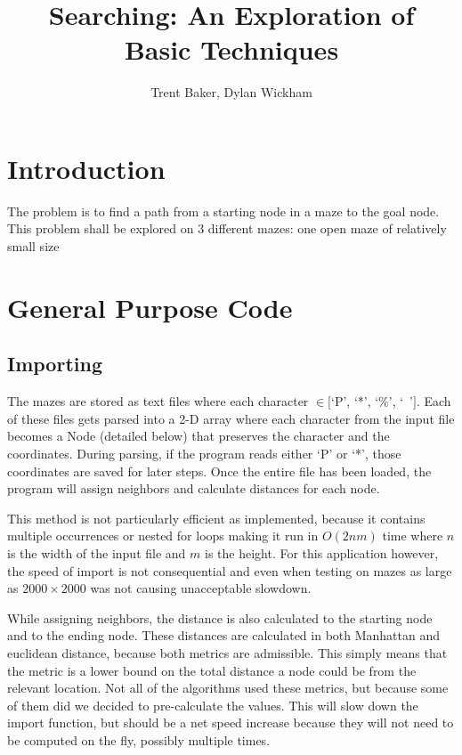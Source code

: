 \documentclass{article}
\title{Searching: An Exploration of \\ Basic Techniques}
\author{Trent Baker, Dylan Wickham}
\begin{document}
\maketitle

\section{Introduction}
The problem is to find a path from a starting node in a maze to the goal node. This problem shall be explored on 3 different mazes: one open maze of relatively small size

\section{General Purpose Code}
\subsection{Importing}
The mazes are stored as text files where each character $\in [$`P', `*', `\%', `\ '$]$. Each of these files gets parsed into a 2-D array where each character from the input file becomes a Node (detailed below) that preserves the character and the coordinates. During parsing, if the program reads either `P' or `*', those coordinates are saved for later steps. Once the entire file has been loaded, the program will assign neighbors and calculate distances for each node.



This method is not particularly efficient as implemented, because it contains multiple occurrences or nested for loops making it run in $O(2nm)$ time where $n$ is the width of the input file and $m$ is the height. For this application however, the speed of import is not consequential and even when testing on mazes as large as $2000 \times 2000$ was not causing unacceptable slowdown.

While assigning neighbors, the distance is also calculated to the starting node and to the ending node. These distances are calculated in both Manhattan and euclidean distance, because both metrics are admissible. This simply means that the metric is a lower bound on the total distance a node could be from the relevant location. Not all of the algorithms used these metrics, but because some of them did we decided to pre-calculate the values. This will slow down the import function, but should be a net speed increase because they will not need to be computed on the fly, possibly multiple times.
\end{document}

